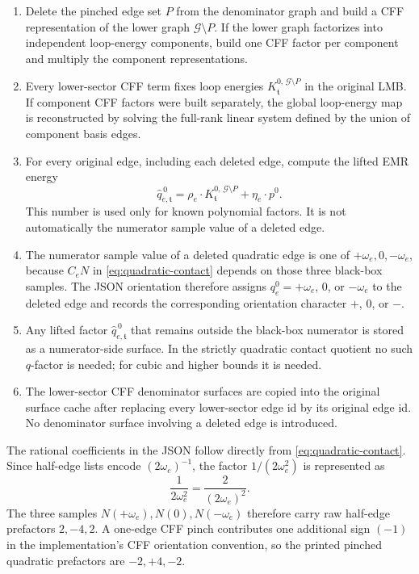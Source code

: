 \documentclass[11pt,a4paper]{report}
\newcommand{\Graph}{\mathcal G}
\begin{document}
\begin{enumerate}[leftmargin=2em]
  \item Delete the pinched edge set \(P\) from the denominator graph and build
        a CFF representation of the lower graph
        \(\Graph\setminus P\).  If the lower graph factorizes into independent
        loop-energy components, build one CFF factor per component and multiply
        the component representations.
  \item Every lower-sector CFF term fixes loop energies
        \(K_{\mathfrak t}^{0,\,\Graph\setminus P}\) in the original LMB.  If
        component CFF factors were built separately, the global loop-energy map
        is reconstructed by solving the full-rank linear system defined by the
        union of component basis edges.
  \item For every original edge, including each deleted edge, compute the
        lifted EMR energy
        \begin{equation}
          \widehat q_{e,\mathfrak t}^{\,0}
          =
          \rho_e\cdot K_{\mathfrak t}^{0,\,\Graph\setminus P}
          +\eta_e\cdot p^0 .
          \label{eq:lifted-deleted-edge-energy}
        \end{equation}
        This number is used only for known polynomial factors.  It is not
        automatically the numerator sample value of a deleted edge.
  \item The numerator sample value of a deleted quadratic edge is one of
        \(+\omega_e,0,-\omega_e\), because
        \(C_eN\) in \eqref{eq:quadratic-contact} depends on those three
        black-box samples.  The JSON orientation therefore assigns
        \(q_e^0=+\omega_e\), \(0\), or \(-\omega_e\) to the deleted edge and
        records the corresponding orientation character \(+\), \(0\), or \(-\).
  \item Any lifted factor \(\widehat q_{e,\mathfrak t}^{\,0}\) that remains
        outside the black-box numerator is stored as a numerator-side surface.
        In the strictly quadratic contact quotient no such \(q\)-factor is
        needed; for cubic and higher bounds it is needed.
  \item The lower-sector CFF denominator surfaces are copied into the original
        surface cache after replacing every lower-sector edge id by its
        original edge id.  No denominator surface involving a deleted edge is
        introduced.
\end{enumerate}
The rational coefficients in the JSON follow directly from
\eqref{eq:quadratic-contact}.  Since half-edge lists encode
\((2\omega_e)^{-1}\), the factor \(1/(2\omega_e^2)\) is represented as
\[
  \frac{1}{2\omega_e^2}
  =
  \frac{2}{(2\omega_e)^2}.
\]
The three samples \(N(+\omega_e),N(0),N(-\omega_e)\) therefore carry raw
half-edge prefactors \(2,-4,2\).  A one-edge CFF pinch contributes one
additional sign \((-1)\) in the implementation's CFF orientation convention, so
the printed pinched quadratic prefactors are \(-2,+4,-2\).
\end{document}
